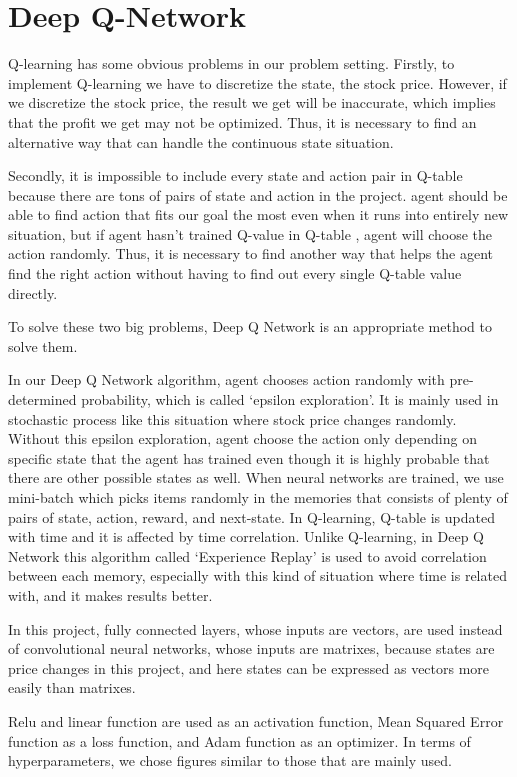 \section{Deep Q-Network}

Q-learning has some obvious problems in our problem setting.
Firstly, to implement Q-learning we have to discretize the state, the stock price. However, if we discretize the stock price, the result we get will be inaccurate, which implies that the profit we get may not be optimized. Thus, it is necessary to find an alternative way that can handle the continuous state situation.

Secondly, it is impossible to include every state and action pair in Q-table because there are tons of pairs of state and action in the project. agent should be able to find action that fits our goal the most even when it runs into entirely new situation, but if agent hasn't trained Q-value in Q-table , agent will choose the action randomly. Thus, it is necessary to find another way that helps the agent find the right action without having to find out every single Q-table value directly.

To solve these two big problems, Deep Q Network is an appropriate method to solve them.

In our Deep Q Network algorithm, agent chooses action randomly with pre-determined probability, which is called ‘epsilon exploration’. It is mainly used in stochastic process like this situation where stock price changes randomly. Without this epsilon exploration, agent choose the action only depending on specific state that the agent has trained even though it is highly probable that there are other possible states as well. 
When neural networks are trained, we use mini-batch which picks items randomly in the memories that consists of plenty of pairs of state, action, reward, and next-state. In Q-learning, Q-table is updated with time and it is affected by time correlation. Unlike Q-learning, in Deep Q Network this algorithm called ‘Experience Replay’ is used to avoid correlation between each memory, especially with this kind of situation where time is related with, and it makes results better.     

In this project, fully connected layers, whose inputs are vectors, are used instead of convolutional neural networks, whose inputs are matrixes, because states are price changes in this project, and here states can be expressed as vectors more easily than matrixes. 

Relu and linear function are used as an activation function, Mean Squared Error function as a loss function, and Adam function as an optimizer. In terms of hyperparameters, we chose figures similar to those that are mainly used. 

